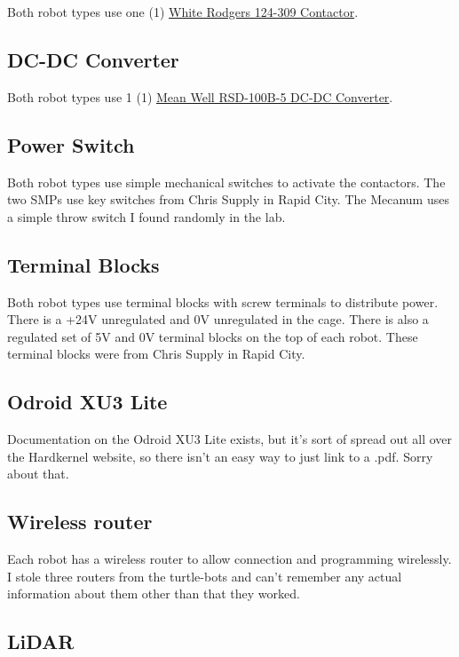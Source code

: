 Both robot types use one (1) \href{run:contactor.pdf}{White Rodgers 124-309 Contactor}.

\subsection{DC-DC Converter}

Both robot types use 1 (1) \href{run:Mean_Well-RSD-100B-5-datasheet.pdf}{Mean Well RSD-100B-5 DC-DC Converter}.

\subsection{Power Switch}

Both robot types use simple mechanical switches to activate the contactors. The two SMPs use key switches from Chris Supply in Rapid City. The Mecanum uses a simple throw switch I found randomly in the lab.

\subsection{Terminal Blocks}

Both robot types use terminal blocks with screw terminals to distribute power. There is a +24V unregulated and 0V unregulated in the cage. There is also a regulated set of 5V and 0V terminal blocks on the top of each robot. These terminal blocks were from Chris Supply in Rapid City.

\subsection{Odroid XU3 Lite}

Documentation on the Odroid XU3 Lite exists, but it's sort of spread out all over the Hardkernel website, so there isn't an easy way to just link to a .pdf. Sorry about that.

\subsection{Wireless router}
Each robot has a wireless router to allow connection and programming wirelessly. I stole three routers from the turtle-bots and can't remember any actual information about them other than that they worked.

\subsection{LiDAR}

